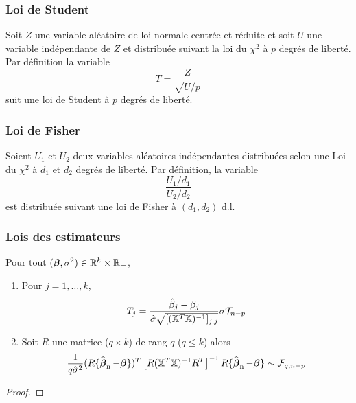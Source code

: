 \begin{frame}
\frametitle{Loi de Student}
\begin{definition}
Soit $Z$ une variable aléatoire de loi normale centrée et réduite et soit $U$ une variable indépendante de $Z$ et distribuée suivant la loi du
$\chi^2$ à $p$ degrés de liberté.
Par définition la variable
\[
T = \frac{Z}{\sqrt{U/p}}
\]
suit une loi de Student à $p$ degrés de liberté.
\end{definition}
\end{frame}

\begin{frame}
\frametitle{Loi de Fisher}
\begin{definition}
 Soient $U_1$ et  $U_2$ deux variables aléatoires indépendantes distribuées  selon une Loi du $\chi^2$ à $d_1$ et $d_2$ degrés de liberté.
Par définition, la variable
\[
 \frac{U_1/d_1}{U_2/d_2}
\]
est distribuée suivant une loi de Fisher à $(d_1,d_2)$ d.l.
\end{definition}
\end{frame}

\begin{frame}
\frametitle{Lois des estimateurs}
\begin{theo}
Pour tout $(\boldsymbol{\beta},\sigma^2) \in \mathbb{R}^k \times \mathbb{R}_+$,
\begin{enumerate}
\item Pour $j=1,\dots,k$,
\[
T_j= \frac{\hat{\beta}_j- \beta_j}{\hat{\sigma}\sqrt{[(\mathbb{X}^T \mathbb{X})^{-1}]_{j,j}}} \sigma \mathcal{T}_{n-p}
\]
\item Soit $R$ une matrice ($q \times k$) de rang $q$ ($q \leq k$) alors
\[
\frac{1}{q \hat{\sigma}^2} (R\{\operatorname{\widehat{\boldsymbol{\beta}}_n}-\boldsymbol{\beta}\})^T \left[ R (\mathbb{X}^T \mathbb{X})^{-1} R^T \right]^{-1} R\{\operatorname{\widehat{\boldsymbol{\beta}}_n}-\boldsymbol{\beta}\}
\sim \mathcal{F}_{q,n-p}
\]
\end{enumerate}
\end{theo}
\begin{proof}
\end{proof}
\end{frame}

